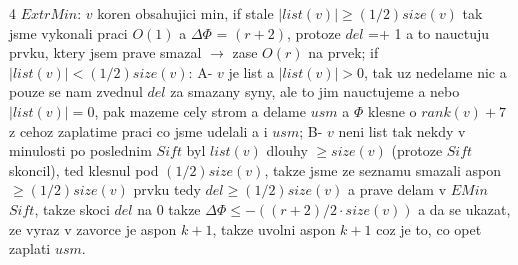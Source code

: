 \documentclass[8pt]{extarticle}
\begin{document}
\begin{multicols*}{4}
$ExtrMin$: $v$ koren obsahujici min, if stale $|list(v)|\geq (1/2)size(v)$ tak jsme vykonali praci $O(1)$ a $\Delta\Phi$ = $(r+2)$, protoze $del$ =+ 1 a to nauctuju prvku, ktery jsem prave smazal $\rightarrow$ zase $O(r)$ na prvek; if $|list(v)|<(1/2)size(v)$: A- $v$ je list a $|list(v)|>0$, tak uz nedelame nic a pouze se nam zvednul $del$ za smazany syny, ale to jim nauctujeme a nebo $|list(v)|=0$, pak mazeme cely strom a delame $usm$ a $\Phi$ klesne o $rank(v)+7$ z cehoz zaplatime praci co jsme udelali a i $usm$; B- $v$ neni list tak nekdy v minulosti po poslednim $Sift$ byl $list(v)$ dlouhy $\geq size(v)$ (protoze $Sift$ skoncil), ted klesnul pod $(1/2)size(v)$, takze jsme ze seznamu smazali aspon $\geq (1/2)size(v)$ prvku tedy $del\geq(1/2)size(v)$ a prave delam v $EMin$ $Sift$, takze skoci $del$ na 0 takze $\Delta\Phi \leq -((r+2)/2 \cdot size(v))$ a da se ukazat, ze vyraz v zavorce je aspon $k+1$, takze uvolni aspon $k+1$ coz je to, co opet zaplati $usm$.


\end{multicols*}
\end{document}
